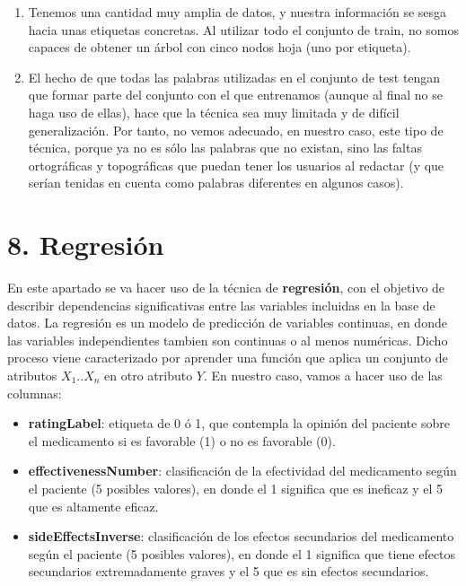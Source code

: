 \documentclass[spanish,]{article}
\providecommand{\tightlist}{%
  \setlength{\itemsep}{0pt}\setlength{\parskip}{0pt}}
\begin{document}
\begin{enumerate}
\def\labelenumi{\arabic{enumi}.}
\item
  Tenemos una cantidad muy amplia de datos, y nuestra información se
  sesga hacia unas etiquetas concretas. Al utilizar todo el conjunto de
  train, no somos capaces de obtener un árbol con cinco nodos hoja (uno
  por etiqueta).
\item
  El hecho de que todas las palabras utilizadas en el conjunto de test
  tengan que formar parte del conjunto con el que entrenamos (aunque al
  final no se haga uso de ellas), hace que la técnica sea muy limitada y
  de difícil generalización. Por tanto, no vemos adecuado, en nuestro
  caso, este tipo de técnica, porque ya no es sólo las palabras que no
  existan, sino las faltas ortográficas y topográficas que puedan tener
  los usuarios al redactar (y que serían tenidas en cuenta como palabras
  diferentes en algunos casos).
\end{enumerate}

\newpage

\section{8. Regresión}\label{regresion}

En este apartado se va hacer uso de la técnica de \textbf{regresión},
con el objetivo de describir dependencias significativas entre las
variables incluidas en la base de datos. La regresión es un modelo de
predicción de variables continuas, en donde las variables independientes
tambien son continuas o al menos numéricas. Dicho proceso viene
caracterizado por aprender una función que aplica un conjunto de
atributos \(X_1..X_n\) en otro atributo \(Y\). En nuestro caso, vamos a
hacer uso de las columnas:

\begin{itemize}
\tightlist
\item
  \textbf{ratingLabel}: etiqueta de 0 ó 1, que contempla la opinión del
  paciente sobre el medicamento si es favorable (1) o no es favorable
  (0).
\item
  \textbf{effectivenessNumber}: clasificación de la efectividad del
  medicamento según el paciente (5 posibles valores), en donde el 1
  significa que es ineficaz y el 5 que es altamente eficaz.
\item
  \textbf{sideEffectsInverse}: clasificación de los efectos secundarios
  del medicamento según el paciente (5 posibles valores), en donde el 1
  significa que tiene efectos secundarios extremadamente graves y el 5
  que es sin efectos secundarios.
\end{itemize}
\end{document}
